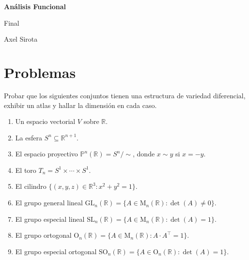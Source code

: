 \documentclass[11pt]{article}
\newcommand{\R}{{\mathbb{R}}}
\numberwithin{theorem}{subsection}
\begin{document}
	\pagestyle{empty}
	\pagestyle{fancy}
	\fancyfoot[CO]{\slshape \thepage}
	\renewcommand{\headrulewidth}{0pt}
	
	
	
	\centerline{\bf An\'alisis Funcional}
	\centerline{\sc Final}
	\centerline{\sc Axel Sirota}
	
	\tableofcontents
	\newpage
	
\section{Problemas}

\begin{question}
	Probar que los siguientes conjuntos tienen una estructura de variedad diferencial, exhibir un atlas y hallar la dimensi\'on en cada caso.
	\begin{enumerate}
		\item Un espacio vectorial $V$ sobre $\R$.
		\item La esfera $S^n\subseteq\R^{n+1}$.
		\item El espacio proyectivo $\mathbb{P}^n(\R) = S^n / \sim$, donde $x\sim y$ si $x=- y$.
		\item El toro $T_n = S^1\times\cdots\times S^1$.
		\item El cilindro $\{(x,y,z)\in\R^3:x^2+y^2=1\}$.
		\item El grupo general lineal $\mathrm{GL}_n(\R)=\{A\in\mathrm{M}_n(\R):\det(A)\neq 0\}$.
		\item El grupo especial lineal $\mathrm{SL}_n(\R)=\{A\in\mathrm{M}_n(\R):\det(A)=1\}$.
		\item El grupo ortogonal $\mathrm{O}_n(\R) = \{A\in\mathrm{M}_n(\R):A\cdot A^\intercal=1\}$.
		\item El grupo especial ortogonal $\mathrm{SO}_n(\R)=\{A\in\mathrm{O}_n(\R) : \det(A)=1\}$.
	\end{enumerate}
\end{question}
\end{document}
